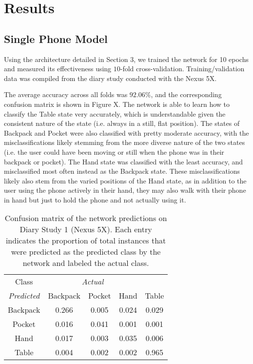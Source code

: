 \section{Results}
\subsection{Single Phone Model}
Using the architecture detailed in Section 3, we trained the network for 10 epochs
and measured its effectiveness using $10$-fold cross-validation.
Training/validation data was compiled from the diary study conducted with the Nexus 5X.

The average accuracy across all folds was $92.06\%$, and the corresponding
confusion matrix is shown in Figure X. The network is able to learn how to 
classify the Table state very accurately, which is understandable given 
the consistent nature of the state (i.e. always in a still, flat position). The states
of Backpack and Pocket were also classified with pretty moderate accuracy,
with the misclassifications likely stemming from the more diverse nature of 
the two states (i.e. the user could have been moving or still when the phone was
in their backpack or pocket). The Hand state was classified with the least accuracy,
and misclassified most often instead as the Backpack state. These misclassifications
likely also stem from the varied positions of the Hand state, as in addition to the user
using the phone actively in their hand, they may also walk with their phone in hand
but just to hold the phone and not actually using it.

\begin{table}[h]
\caption{Confusion matrix of the network predictions on Diary Study 1 (Nexus 5X). Each entry indicates the proportion of
total instances that were predicted as the predicted class by the network and labeled the actual class.}\label{fig:confusion} \centering
\begin{tabular}{| c || c | c | c | c |}  
\toprule
Class &  \multicolumn{3}{c}{\textit{Actual}} \\
\cmidrule{1-5}
\textit{Predicted}		&	Backpack    & 	Pocket 	& 	Hand	&	Table \\
\midrule
Backpack			&	0.266 	&	0.005	&	0.024 	&	0.029 \\
Pocket			&	0.016 	&	0.041 	&	0.001 	&	0.001 \\
Hand			&	0.017 	&	0.003 	&	0.035 	&	0.006 \\
Table			&	0.004 	&	0.002 	&	0.002 	&	0.965\\
\bottomrule
\end{tabular}
\end{table}


